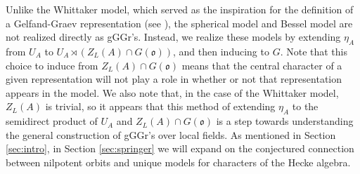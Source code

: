 \documentclass[11pt,letterpaper]{article}
\newcommand{\goth}{\mathfrak}
\newcommand{\GSp}{\textup{GSp}}
\newcommand{\Sp}{\textup{Sp}}
\newcommand{\calHom}{\textup{Hom}}
\newcommand{\ind}{\textup{ind}}
\newtheorem{Proposition}[Theorem]{Proposition}
\theoremstyle{remark}
\numberwithin{equation}{section}
\begin{document}


Unlike the Whittaker model, which served as the inspiration for the definition of a Gelfand-Graev representation (see \cite{GG}), the spherical model and Bessel model are not realized directly as gGGr's. Instead, we realize these models by extending $\eta_A$ from $U_A$ to $U_A\rtimes (Z_L(A)\cap G(\goth{o}))$, and then inducing to $G$. Note that this choice to induce from $Z_L(A) \cap G(\goth{o})$ means that the central character of a given representation will not play a role in whether or not that representation appears in the model. We also note that, in the case of the Whittaker model, $Z_L(A)$ is trivial, so it appears that this method of extending $\eta_A$ to the semidirect product of $U_A$ and $Z_L(A) \cap G(\goth{o})$ is a step towards understanding the general construction of gGGr's over local fields. As mentioned in Section \ref{sec:intro}, in Section \ref{sec:springer} we will expand on the conjectured connection between nilpotent orbits and unique models for characters of the Hecke algebra. 


\end{document}
